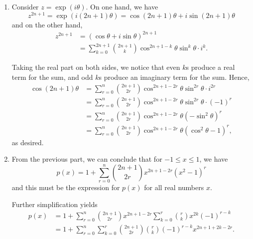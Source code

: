 \Question{\currfilebase}

\begin{enumerate}
    \item Consider \(z = \exp(i \theta)\). On one hand, we have
          \[
              z^{2n + 1} = \exp(i (2n + 1) \theta) = \cos (2n + 1) \theta + i \sin (2n + 1) \theta
          \]
          and on the other hand,
          \begin{align*}
              z^{2n + 1} & = (\cos \theta + i \sin \theta)^{2n + 1}                                                      \\
                         & = \sum_{k = 0}^{2n + 1} \binom{2n + 1}{k} \cos^{2n + 1 - k} \theta \sin^{k} \theta \cdot i^k.
          \end{align*}

          Taking the real part on both sides, we notice that even \(k\)s produce a real term for the sum, and odd \(k\)s produce an imaginary term for the sum. Hence,
          \begin{align*}
              \cos (2n + 1) \theta & = \sum_{r = 0}^{n} \binom{2n + 1}{2r} \cos^{2n + 1 - 2r} \theta \sin^{2r} \theta \cdot i^{2r}       \\
                                   & = \sum_{r = 0}^{n} \binom{2n + 1}{2r} \cos^{2n + 1 - 2r} \theta \sin^{2r} \theta \cdot (-1)^{r}     \\
                                   & = \sum_{r = 0}^{n} \binom{2n + 1}{2r} \cos^{2n + 1 - 2r} \theta \left(- \sin^2 \theta\right)^{r}    \\
                                   & = \sum_{r = 0}^{n} \binom{2n + 1}{2r} \cos^{2n + 1 - 2r} \theta \left(\cos^2 \theta - 1\right)^{r},
          \end{align*}
          as desired.

    \item From the previous part, we can conclude that for \(-1 \leq x \leq 1\), we have
          \[
              p(x) = 1 + \sum_{r = 0}^{n} \binom{2n + 1}{2r} x^{2n + 1 - 2r} \left(x^2 - 1\right)^{r}
          \]
          and this must be the expression for \(p(x)\) for all real numbers \(x\).

          Further simplification yields
          \begin{align*}
              p(x) & = 1 + \sum_{r = 0}^{n} \binom{2n + 1}{2r} x^{2n + 1 - 2r} \sum_{k = 0}^{r} \binom{r}{k} x^{2k} (-1)^{r - k} \\
                   & = 1 + \sum_{r = 0}^{n} \sum_{k = 0}^{r} \binom{2n + 1}{2r} \binom{r}{k} (-1)^{r - k} x^{2n + 1 + 2k - 2r}.
          \end{align*}


\end{enumerate}

